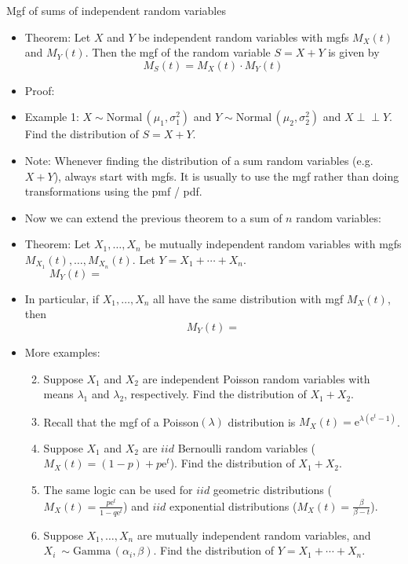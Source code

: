 \documentclass{article}
\newcommand{\vecn}[2]{#1_1, \ldots, #1_{#2}}	%
\newcommand{\e}{\mathrm{e}}		%
\newcommand{\ind}{\perp \!\!\! \perp}			%
\newcommand{\follow}[1]{\sim \text{#1}\,}		%
\begin{document}
Mgf of sums of independent random variables\bigskip
\begin{itemize}
    \item Theorem: Let $X$ and $Y$ be independent random variables with mgfs $M_X(t)$ and $M_Y(t)$. Then the mgf of the random variable $S = X + Y$ is given by
    \[M_S(t) = M_X(t) \cdot M_Y(t)\]
    \item Proof:\vspace{90pt}
    \item Example 1: $X \follow{Normal}(\mu_1, \sigma_1^2)$ and $Y \follow{Normal}(\mu_2, \sigma_2^2)$ and $X \ind Y$. Find the distribution of $S = X + Y$.\vspace{90pt}
    \item Note: Whenever finding the distribution of a sum random variables (e.g. $X + Y$), always start with mgfs. It is usually to use the mgf rather than doing transformations using the pmf / pdf.\bigskip
    \item Now we can extend the previous theorem to a sum of $n$ random variables:
    \item[] Theorem: Let $\vecn{X}{n}$ be mutually independent random variables with mgfs $M_{X_1}(t), \ldots, M_{X_n}(t)$. Let $Y = X_1 + \cdots + X_n$.
    \[M_Y(t) = \hspace{300pt}\]
    \item[] In particular, if $\vecn{X}{n}$ all have the same distribution with mgf $M_X(t)$, then
    \[M_Y(t) = \]
    \item More examples: 
    \begin{enumerate}\setcounter{enumi}{1}
        \item Suppose $X_1$ and $X_2$ are independent Poisson random variables with means $\lambda_1$ and $\lambda_2$, respectively. Find the distribution of $X_1 + X_2$.
        \item[] Recall that the mgf of a Poisson$(\lambda)$ distribution is $M_X(t) = \e^{\lambda(\e^t - 1)}$.\vspace{30pt}
        \item Suppose $X_1$ and $X_2$ are $iid$ Bernoulli random variables ($M_X(t) = (1 - p) + p\e^t$). Find the distribution of $X_1 + X_2$.\vspace{30pt}
        \item The same logic can be used for $iid$ geometric distributions ($M_X(t) = \frac{p\e^t}{1 - q\e^t}$) and $iid$ exponential distributions ($M_X(t) = \frac{\beta}{\beta - t}$).\vspace{50pt}
        \item Suppose $\vecn{X}{n}$ are mutually independent random variables, and \\$X_i\ \follow{Gamma}(\alpha_i, \beta)$. Find the distribution of $Y = X_1+ \cdots + X_n$.

\end{enumerate}
\end{itemize}
\end{document}
